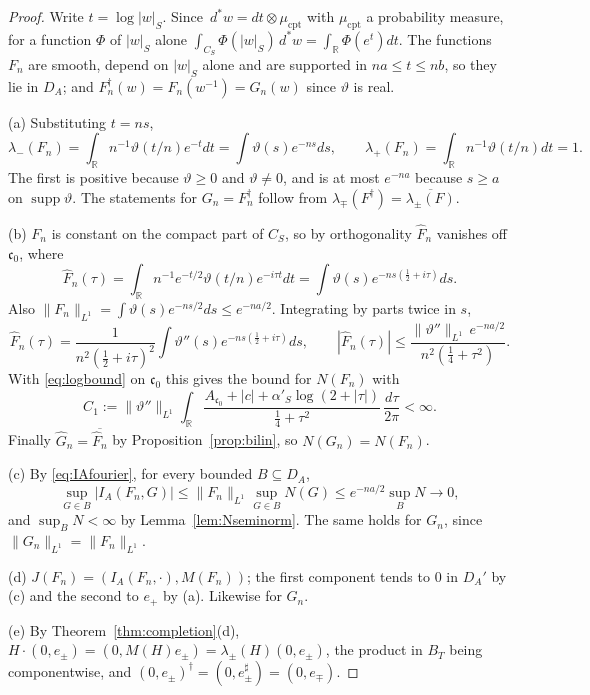 \documentclass[11pt]{amsart}
\theoremstyle{definition}
\theoremstyle{remark}
\newcommand{\R}{\mathbb R}
\newcommand{\dstar}{\,d^{*}}
\newcommand{\supp}{\operatorname{supp}}
\newcommand{\DA}{D_A}
\newcommand{\BT}{B_T}
\begin{document}
\begin{proof}
Write $t=\log|w|_S$.  Since $\dstar w=dt\otimes\mu_{\mathrm{cpt}}$ with
$\mu_{\mathrm{cpt}}$ a probability measure, for a function $\Phi$ of $|w|_S$
alone $\int_{C_S}\Phi(|w|_S)\dstar w=\int_{\R}\Phi(e^{t})dt$.  The functions
$F_n$ are smooth, depend on $|w|_S$ alone and are supported in
$na\le t\le nb$, so they lie in $\DA$; and $F_n^{\dagger}(w)=F_n(w^{-1})=G_n(w)$
since $\vartheta$ is real.

(a)  Substituting $t=ns$,
\[
\lambda_-(F_n)=\int_{\R}n^{-1}\vartheta(t/n)e^{-t}dt=\int\vartheta(s)e^{-ns}ds,
\qquad
\lambda_+(F_n)=\int_{\R}n^{-1}\vartheta(t/n)dt=1 .
\]
The first is positive because $\vartheta\ge0$ and $\vartheta\ne0$, and is at
most $e^{-na}$ because $s\ge a$ on $\supp\vartheta$.  The statements for
$G_n=F_n^{\dagger}$ follow from
$\lambda_{\mp}(F^{\dagger})=\overline{\lambda_{\pm}(F)}$.

(b)  $F_n$ is constant on the compact part of $C_S$, so by orthogonality
$\widehat F_n$ vanishes off $\mathfrak c_0$, where
\[
\widehat F_n(\tau)=\int_{\R}n^{-1}e^{-t/2}\vartheta(t/n)e^{-i\tau t}dt=
\int\vartheta(s)e^{-ns(\frac12+i\tau)}ds .
\]
Also $\lVert F_n\rVert_{L^{1}}=\int\vartheta(s)e^{-ns/2}ds\le e^{-na/2}$.
Integrating by parts twice in $s$,
\[
\widehat F_n(\tau)=\frac{1}{n^{2}(\frac12+i\tau)^{2}}
\int\vartheta''(s)e^{-ns(\frac12+i\tau)}ds,\qquad
|\widehat F_n(\tau)|\le
\frac{\lVert\vartheta''\rVert_{L^{1}}\,e^{-na/2}}{n^{2}(\frac14+\tau^{2})} .
\]
With \eqref{eq:logbound} on $\mathfrak c_0$ this gives the bound for $N(F_n)$
with
\[
C_1:=\lVert\vartheta''\rVert_{L^{1}}\int_{\R}
\frac{A_{\mathfrak c_0}+|c|+\alpha'_S\log(2+|\tau|)}{\frac14+\tau^{2}}\,
\frac{d\tau}{2\pi}<\infty .
\]
Finally $\widehat G_n=\overline{\widehat F_n}$ by
Proposition~\ref{prop:bilin}, so $N(G_n)=N(F_n)$.

(c)  By \eqref{eq:IAfourier}, for every bounded $B\subseteq\DA$,
\[
\sup_{G\in B}|I_A(F_n,G)|\le\lVert F_n\rVert_{L^{1}}
\sup_{G\in B}N(G)\le e^{-na/2}\sup_BN\longrightarrow0 ,
\]
and $\sup_BN<\infty$ by Lemma~\ref{lem:Nseminorm}.  The same holds for $G_n$,
since $\lVert G_n\rVert_{L^{1}}=\lVert F_n\rVert_{L^{1}}$.

(d)  $J(F_n)=(I_A(F_n,\cdot),M(F_n))$; the first component tends to $0$ in
$\DA'$ by (c) and the second to $e_+$ by (a).  Likewise for $G_n$.

(e)  By Theorem~\ref{thm:completion}(d),
$H\cdot(0,e_{\pm})=(0,M(H)e_{\pm})=\lambda_{\pm}(H)(0,e_{\pm})$, the product
in $\BT$ being componentwise, and $(0,e_{\pm})^{\dagger}=(0,e_{\pm}^{\sharp})
=(0,e_{\mp})$.
\end{proof}
\end{document}

